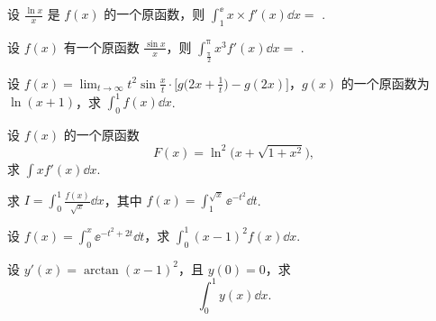 	\begin{ti}
		设 $\frac{\ln x}{x}$ 是 $f(x)$ 的一个原函数，则 $\int_{1}^{\ee} x\times f'(x) \dd{x} = $ \htwo.
	\end{ti}

	\begin{ti}
		设 $f(x)$ 有一个原函数 $\frac{\sin x}{x}$，则 $\int_{\frac{\uppi}{2}}^{\uppi} x^{3} f'(x) \dd{x} = $
		\htwo.
	\end{ti}

	\begin{ti}
		设 $f(x) = \lim_{t \to \infty} t^{2} \sin \frac{x}{t} \cdot \bigl[ g\bigl( 2x + \frac{1}{t} \bigr) - g(2x) \bigr]$，$g(x)$ 的一个原函数为 $\ln(x + 1)$，求 $\int_{0}^{1} f(x) \dd{x}$.
	\end{ti}

	\begin{ti}
		设 $f(x)$ 的一个原函数 \[F(x) = \ln^{2}\bigl( x + \sqrt{1 + x^{2}} \bigr),\]求 $\int x f'(x) \dd{x}$.
	\end{ti}

	\begin{ti}
		求 $I = \int_{0}^{1} \frac{f(x)}{\sqrt{x}} \dd{x}$，其中 $f(x) = \int_{1}^{\sqrt{x}} \ee^{-t^{2}} \dd{t}$.
	\end{ti}

	\begin{ti}
		设 $f(x) = \int_{0}^{x} \ee^{-t^{2} + 2t} \dd{t}$，求 $\int_{0}^{1} (x - 1)^{2} f(x) \dd{x}$.
	\end{ti}

	\begin{ti}
		设 $y'(x) = \arctan (x - 1)^{2}$，且 $y(0) = 0$，求
		\[
			\int_{0}^{1} y(x) \dd{x}.
		\]
	\end{ti}